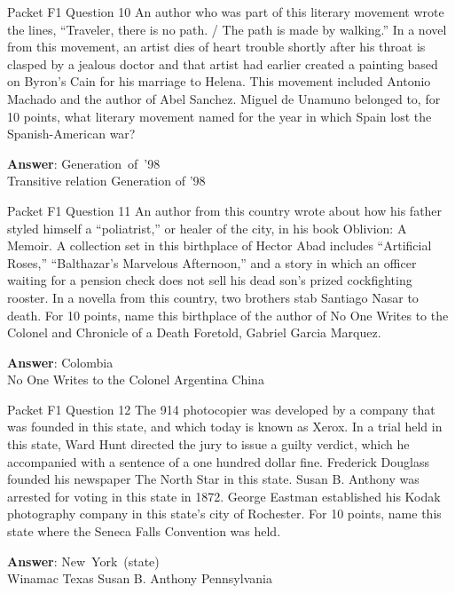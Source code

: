 \begin{frame}{Packet F1 Question 10}
An author who was part   of this literary movement wrote the lines, “Traveler, there is no path. / The path is made by walking.” In a novel from this movement, an artist dies of heart trouble shortly after his throat is clasped by a jealous doctor and that artist had earlier created a painting based on Byron’s Cain for his marriage to Helena. This movement included Antonio Machado and the author of Abel   Sanchez. Miguel de   Unamuno belonged to, for 10 points, what literary movement named for the year   in which Spain lost the Spanish-American war?  

\textbf{Answer}: Generation\ of\ '98\\
 Transitive relation
 Generation of '98
\end{frame}

\begin{frame}{Packet F1 Question 11}
An author from this country wrote about how his father styled himself a “poliatrist,” or healer of the city, in his book Oblivion: A Memoir. A collection set in this birthplace of Hector Abad includes “Artificial Roses,” “Balthazar’s Marvelous Afternoon,” and a story in which an officer waiting for a pension check does not sell his dead son’s prized cockfighting   rooster. In a novella from this country, two brothers stab   Santiago Nasar to death. For 10 points, name this birthplace of the author of No One Writes to the Colonel and Chronicle of a Death Foretold, Gabriel Garcia Marquez.    

\textbf{Answer}: Colombia\\
 No One Writes to the Colonel
 Argentina
 China
\end{frame}

\begin{frame}{Packet F1 Question 12}
The 914 photocopier was developed by a company that was founded in this state, and which today is known as Xerox. In a trial held in this state, Ward Hunt directed the jury to issue a guilty verdict, which he accompanied with a sentence of a one hundred dollar fine. Frederick Douglass founded his newspaper The North Star in this state. Susan B. Anthony was arrested for voting in this state in 1872. George Eastman established his Kodak photography company in this state’s city of Rochester. For 10 points, name this state where the Seneca Falls Convention was held.        

\textbf{Answer}: New\ York\ (state)\\
 Winamac
 Texas
 Susan B. Anthony
 Pennsylvania
\end{frame}

